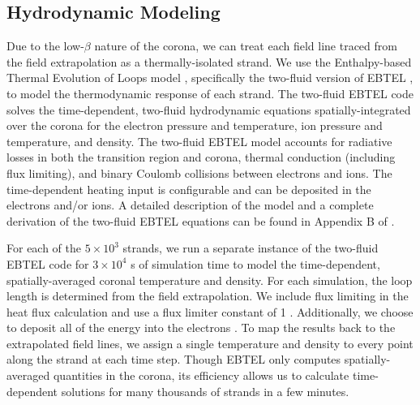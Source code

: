 \subsection{Hydrodynamic Modeling}\label{loops}

Due to the low-$\beta$ nature of the corona, we can treat each field line traced from the field extrapolation as a thermally-isolated strand. We use the Enthalpy-based Thermal Evolution of Loops model \citep[EBTEL,][]{klimchuk_highly_2008,cargill_enthalpy-based_2012,cargill_enthalpy-based_2012-1}, specifically the two-fluid version of EBTEL \citep{barnes_inference_2016}, to model the thermodynamic response of each strand. The two-fluid EBTEL code solves the time-dependent, two-fluid hydrodynamic equations spatially-integrated over the corona for the electron pressure and temperature, ion pressure and temperature, and density. The two-fluid EBTEL model accounts for radiative losses in both the transition region and corona, thermal conduction (including flux limiting), and binary Coulomb collisions between electrons and ions. The time-dependent heating input is configurable and can be deposited in the electrons and/or ions. A detailed description of the model and a complete derivation of the two-fluid EBTEL equations can be found in Appendix B of \citet{barnes_inference_2016}.

For each of the $5\times10^3$ strands, we run a separate instance of the two-fluid EBTEL code for $3\times10^4$ s of simulation time to model the time-dependent, spatially-averaged coronal temperature and density. For each simulation, the loop length is determined from the field extrapolation. We include flux limiting in the heat flux calculation and use a flux limiter constant of 1 \citep[see Eqs. 21 and 22 of][]{klimchuk_highly_2008}. Additionally, we choose to deposit all of the energy into the electrons . To map the results back to the extrapolated field lines, we assign a single temperature and density to every point along the strand at each time step. Though EBTEL only computes spatially-averaged quantities in the corona, its efficiency allows us to calculate time-dependent solutions for many thousands of strands in a few minutes.

